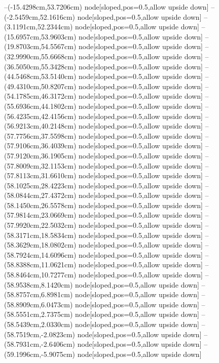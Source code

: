 --(-15.4298cm,53.7206cm) node[sloped,pos=0.5,allow upside down]{\ArrowIn}
--(-2.5459cm,52.1616cm) node[sloped,pos=0.5,allow upside down]{\ArrowIn}
--(3.1191cm,52.2344cm) node[sloped,pos=0.5,allow upside down]{\ArrowIn}
--(15.6957cm,53.9603cm) node[sloped,pos=0.5,allow upside down]{\ArrowIn}
--(19.8703cm,54.5567cm) node[sloped,pos=0.5,allow upside down]{\ArrowIn}
--(32.9990cm,55.6668cm) node[sloped,pos=0.5,allow upside down]{\ArrowIn}
--(36.5050cm,55.3428cm) node[sloped,pos=0.5,allow upside down]{\ArrowIn}
--(44.5468cm,53.5140cm) node[sloped,pos=0.5,allow upside down]{\ArrowIn}
--(49.4310cm,50.8207cm) node[sloped,pos=0.5,allow upside down]{\ArrowIn}
--(54.1785cm,46.3172cm) node[sloped,pos=0.5,allow upside down]{\ArrowIn}
--(55.6936cm,44.1802cm) node[sloped,pos=0.5,allow upside down]{\ArrowIn}
--(56.4235cm,42.4156cm) node[sloped,pos=0.5,allow upside down]{\ArrowIn}
--(56.9213cm,40.2148cm) node[sloped,pos=0.5,allow upside down]{\ArrowIn}
--(57.7756cm,37.5598cm) node[sloped,pos=0.5,allow upside down]{\ArrowIn}
--(57.9106cm,36.4039cm) node[sloped,pos=0.5,allow upside down]{\ArrowIn}
--(57.9120cm,36.1905cm) node[sloped,pos=0.5,allow upside down]{\arrowIn}
--(57.8009cm,32.1153cm) node[sloped,pos=0.5,allow upside down]{\ArrowIn}
--(57.8113cm,31.6610cm) node[sloped,pos=0.5,allow upside down]{\arrowIn}
--(58.1025cm,28.4223cm) node[sloped,pos=0.5,allow upside down]{\ArrowIn}
--(58.0844cm,27.4372cm) node[sloped,pos=0.5,allow upside down]{\arrowIn}
--(58.1450cm,26.5578cm) node[sloped,pos=0.5,allow upside down]{\arrowIn}
--(57.9814cm,23.0669cm) node[sloped,pos=0.5,allow upside down]{\ArrowIn}
--(57.9920cm,22.5032cm) node[sloped,pos=0.5,allow upside down]{\arrowIn}
--(58.3171cm,18.5834cm) node[sloped,pos=0.5,allow upside down]{\ArrowIn}
--(58.3629cm,18.0802cm) node[sloped,pos=0.5,allow upside down]{\arrowIn}
--(58.7924cm,14.6096cm) node[sloped,pos=0.5,allow upside down]{\ArrowIn}
--(58.8388cm,11.0621cm) node[sloped,pos=0.5,allow upside down]{\ArrowIn}
--(58.8464cm,10.7277cm) node[sloped,pos=0.5,allow upside down]{\arrowIn}
--(58.9538cm,8.1420cm) node[sloped,pos=0.5,allow upside down]{\ArrowIn}
--(58.8757cm,6.8981cm) node[sloped,pos=0.5,allow upside down]{\ArrowIn}
--(58.8909cm,6.0473cm) node[sloped,pos=0.5,allow upside down]{\arrowIn}
--(58.5551cm,2.7375cm) node[sloped,pos=0.5,allow upside down]{\ArrowIn}
--(58.5439cm,2.0330cm) node[sloped,pos=0.5,allow upside down]{\arrowIn}
--(58.7519cm,-2.0823cm) node[sloped,pos=0.5,allow upside down]{\ArrowIn}
--(58.7931cm,-2.6406cm) node[sloped,pos=0.5,allow upside down]{\arrowIn}
--(59.1996cm,-5.9075cm) node[sloped,pos=0.5,allow upside down]{\ArrowIn}
